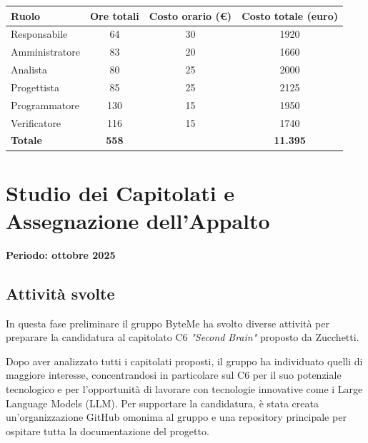 \documentclass[11pt,a4paper]{article}
\begin{document}
\begin{center}
    \begin{tabular}{|l|c|c|c|}
        \hline
        \textbf{Ruolo} & \textbf{Ore totali} & \textbf{Costo orario (€)} & \textbf{Costo totale (euro)} \\
        \hline
        Responsabile & 64 & 30 & 1920 \\
        \hline
        Amministratore & 83 & 20 & 1660 \\
        \hline
        Analista & 80 & 25 & 2000 \\
        \hline
        Progettista & 85 & 25 & 2125 \\
        \hline
        Programmatore & 130 & 15 & 1950 \\
        \hline
        Verificatore & 116 & 15 & 1740 \\
        \hline
        \textbf{Totale} & \textbf{558} & & \textbf{11.395} \\
        \hline
    \end{tabular}
\end{center}

\newpage

\section{Studio dei Capitolati e Assegnazione dell'Appalto}
\small\textbf{Periodo: ottobre 2025}

\subsection{Attività svolte}
In questa fase preliminare il gruppo ByteMe ha svolto diverse attività per preparare la candidatura al capitolato C6 \textit{"Second Brain"} proposto da Zucchetti.

Dopo aver analizzato tutti i capitolati proposti, il gruppo ha individuato quelli di maggiore interesse, concentrandosi in particolare sul C6 per il suo potenziale tecnologico e per l'opportunità di lavorare con tecnologie innovative come i Large Language Models (LLM). Per supportare la candidatura, è stata creata un'organizzazione GitHub omonima al gruppo e una repository principale per ospitare tutta la documentazione del progetto.
\end{document}
